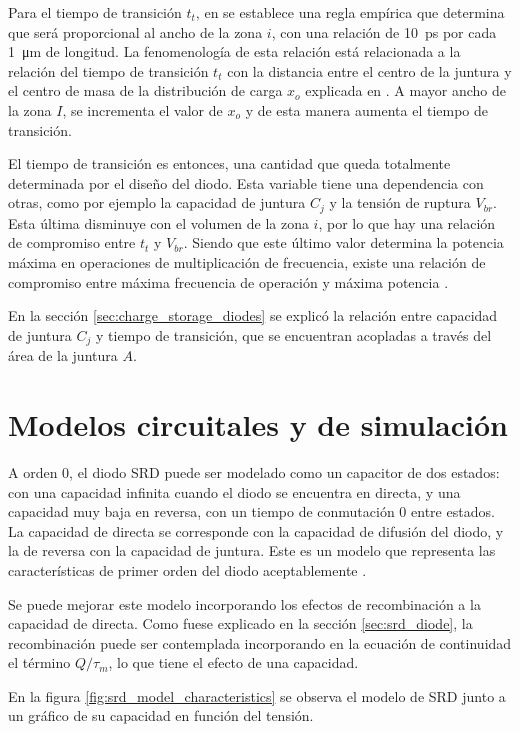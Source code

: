 Para el tiempo de transición $t_t$, en \cite{moll1969} se establece una regla
empírica que determina que será proporcional al ancho de la zona $i$, con una
relación de \qty{10}{\pico\second} por cada \qty{1}{\micro\meter} de longitud.
La fenomenología de esta relación está relacionada a la relación del tiempo de
transición $t_t$ con la distancia entre el centro de la juntura y el centro de
masa de la distribución de carga $x_o$ explicada en \cite{moll1962}. A mayor
ancho de la zona $I$, se incrementa el valor de $x_o$ y de esta manera aumenta
el tiempo de transición.

El tiempo de transición es entonces, una cantidad que queda totalmente
determinada por el diseño del diodo. Esta variable tiene una dependencia con
otras, como por ejemplo la capacidad de juntura $C_j$ y la tensión de ruptura
$V_{br}$. Esta última disminuye con el volumen de la zona $i$, por lo que hay
una relación de compromiso entre $t_t$ y $V_{br}$. Siendo que este último valor
determina la potencia máxima en operaciones de multiplicación de frecuencia,
existe una relación de compromiso entre máxima frecuencia de operación y máxima
potencia \cite{moll1969}.

En la sección \ref{sec:charge_storage_diodes} se explicó la relación entre
capacidad de juntura $C_j$ y tiempo de transición, que se encuentran acopladas a
través del área de la juntura $A$.

\section{Modelos circuitales y de simulación}
\label{sec:srd_simulation_models}

A orden 0, el diodo SRD puede ser modelado como un capacitor de dos estados: con
una capacidad infinita cuando el diodo se encuentra en directa, y una capacidad
muy baja en reversa, con un tiempo de conmutación 0 entre estados. La capacidad
de directa se corresponde con la capacidad de difusión del diodo, y la de
reversa con la capacidad de juntura. Este es un modelo que representa las
características de primer orden del diodo aceptablemente \cite{moll1969}.

Se puede mejorar este modelo incorporando los efectos de recombinación a la
capacidad de directa. Como fuese explicado en la sección \ref{sec:srd_diode}, la
recombinación puede ser contemplada incorporando en la ecuación de continuidad
el término $Q/\tau_m$, lo que tiene el efecto de una capacidad.

En la figura \ref{fig:srd_model_characteristics} se observa el modelo de SRD
junto a un gráfico de su capacidad en función del tensión.

